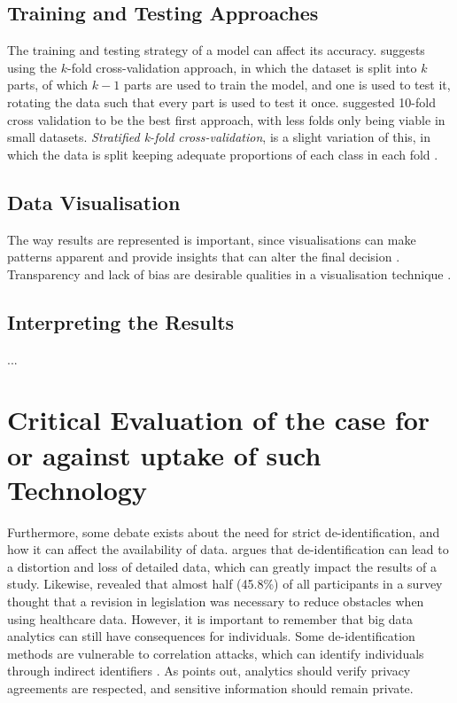 \documentclass[a4paper,12pt]{article}
\begin{document}
\subsection{Training and Testing Approaches}

The training and testing strategy of a model can affect its accuracy.
\textcite[39]{Consoli2019} suggests using the \(k\)-fold cross-validation approach,
in which the dataset is split into \(k\) parts, of which \(k-1\) parts are used
to train the model, and one is used to test it, rotating the data such that
every part is used to test it once.
\textcite{Wong2020} suggested 10-fold cross validation to be the best first
approach, with less folds only being viable in small datasets.
\textit{Stratified k-fold cross-validation}, is a slight variation of this,
in which the data is split keeping adequate proportions of each class in each fold \parencite{Mueller2017}.

\subsection{Data Visualisation}

The way results are represented is important, since visualisations can make patterns apparent and provide insights that can alter the final decision \parencite{Hendriks2019}.
Transparency and lack of bias are desirable qualities in a visualisation technique \parencite{Hendriks2019}.

\subsection{Interpreting the Results}

...

\section{Critical Evaluation of the case for or against uptake of such Technology}

Furthermore, some debate exists about the need for strict de-identification, and how it can affect the availability of data.
\textcite[2]{Shin2018} argues that de-identification can lead to a distortion and loss of detailed data, which can greatly impact the results of a study.
Likewise, \textcite{Kim2019} revealed that almost half (45.8\%) of all participants in a survey thought that a revision in legislation was necessary to reduce obstacles when using healthcare data.
However, it is important to remember that big data analytics can still have consequences for individuals.
Some de-identification methods are vulnerable to correlation attacks, which can identify individuals through indirect identifiers \parencite{Abouelmehdi2018}.
As \textcite{Abouelmehdi2018} points out, analytics should verify privacy agreements are respected, and sensitive information should remain private.
\end{document}
